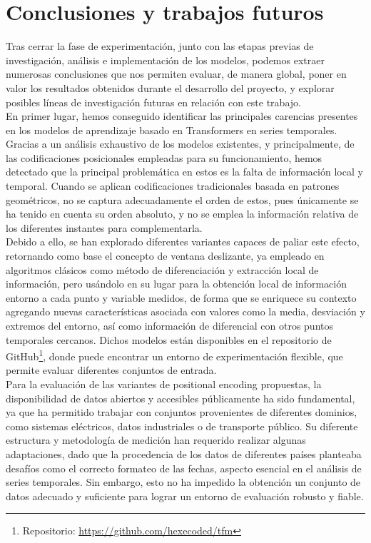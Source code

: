\chapter{Conclusiones y trabajos futuros}

Tras cerrar la fase de experimentación, junto con las etapas previas de investigación, análisis e implementación de los modelos, podemos extraer numerosas conclusiones que nos permiten evaluar, de manera global, poner en valor los resultados obtenidos durante el desarrollo del proyecto, y explorar posibles líneas de investigación futuras en relación con este trabajo.\\

En primer lugar, hemos conseguido identificar las principales carencias presentes en los modelos de aprendizaje basado en Transformers en series temporales. Gracias a un análisis exhaustivo de los modelos existentes, y principalmente, de las codificaciones posicionales empleadas para su funcionamiento, hemos detectado que la principal problemática en estos es la falta de información local y temporal. Cuando se aplican codificaciones tradicionales basada en patrones geométricos, no se captura adecuadamente el orden de estos, pues únicamente se ha tenido en cuenta su orden absoluto, y no se emplea la información relativa de los diferentes instantes para complementarla.\\

Debido a ello, se han explorado diferentes variantes capaces de paliar este efecto, retornando como base el concepto de ventana deslizante, ya empleado en algoritmos clásicos como método de diferenciación y extracción local de información, pero usándolo en su lugar para la obtención local de información entorno a cada punto y variable medidos, de forma que se enriquece su contexto agregando nuevas características asociada con valores como la media, desviación y extremos del entorno, así como información de diferencial con otros puntos temporales cercanos. Dichos modelos están disponibles en el repositorio de GitHub\footnote{Repositorio: \url{https://github.com/hexecoded/tfm}}, donde puede encontrar un entorno de experimentación flexible, que permite evaluar diferentes conjuntos de entrada.\\

Para la evaluación de las variantes de positional encoding propuestas, la disponibilidad de datos abiertos y accesibles públicamente ha sido fundamental, ya que ha permitido trabajar con conjuntos provenientes de diferentes dominios, como sistemas eléctricos, datos industriales o de transporte público. Su diferente estructura y metodología de medición han requerido realizar algunas adaptaciones, dado que la procedencia de los datos de diferentes países planteaba desafíos como el correcto formateo de las fechas, aspecto esencial en el análisis de series temporales. Sin embargo, esto no ha impedido la obtención un conjunto de datos adecuado y suficiente para lograr un entorno de evaluación robusto y fiable.\\

